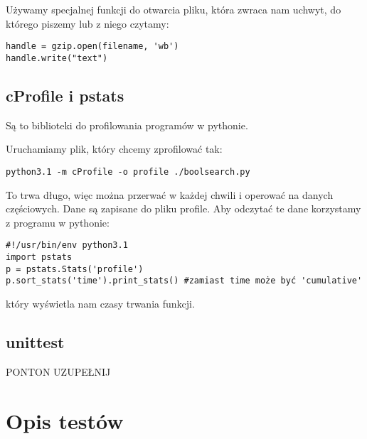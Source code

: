 \documentclass[11pt]{article}
\begin{document}
Używamy specjalnej funkcji do otwarcia pliku, która zwraca nam uchwyt, do którego piszemy lub z niego czytamy:
\begin{verbatim}
handle = gzip.open(filename, 'wb') 
handle.write("text")
\end{verbatim}
\subsection{cProfile i pstats}
Są to biblioteki do profilowania programów w pythonie.

Uruchamiamy plik, który chcemy zprofilować tak:
\begin{verbatim}
python3.1 -m cProfile -o profile ./boolsearch.py
\end{verbatim}
To trwa długo, więc można przerwać w każdej chwili i operować na danych częściowych. Dane są zapisane do pliku profile. Aby odczytać te dane korzystamy z programu w pythonie:
\begin{verbatim}
#!/usr/bin/env python3.1
import pstats
p = pstats.Stats('profile')
p.sort_stats('time').print_stats() #zamiast time może być 'cumulative'
\end{verbatim}
który wyświetla nam czasy trwania funkcji.
\subsection{unittest}
PONTON UZUPEŁNIJ
\section{Opis testów}
\end{document}
